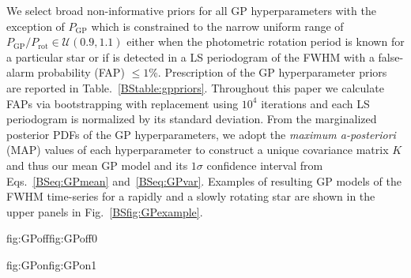 We select broad non-informative priors for all GP hyperparameters with the
exception of $P_{\text{GP}}$ which is constrained to the narrow uniform range of
$P_{\text{GP}}/P_{\text{rot}} \in \mathcal{U}(0.9,1.1)$ either when the photometric rotation period is known for a
particular star or if \prot{} is detected in a LS periodogram
of the FWHM with a false-alarm probability (FAP) $\le 1$\%. Prescription of the GP hyperparameter priors are
reported in Table.~\ref{BStable:gppriors}. Throughout this paper we calculate FAPs via
bootstrapping with replacement using $10^4$ iterations and each LS periodogram is normalized by its standard
deviation. From the marginalized posterior PDFs of the GP hyperparameters, we adopt the \emph{maximum a-posteriori}
(MAP) values of each hyperparameter to construct a unique covariance matrix $K$ and thus our mean GP model
and its $1\sigma$ confidence interval from Eqs.~\ref{BSeq:GPmean} and~\ref{BSeq:GPvar}. Examples of resulting
GP models of the FWHM time-series for a rapidly and a slowly rotating star are shown in the upper panels in
Fig.~\ref{BSfig:GPexample}.





\begin{figure*}
  \centering
  \hspace{-\hsize}%
  \begin{ocg}{fig:GPoff}{fig:GPoff}{0}%
  \end{ocg}%
  \begin{ocg}{fig:GPon}{fig:GPon}{1}%
  \end{ocg}
  \hspace{-\hsize}%
  \caption{Examples of our GP formalism used to mitigate RV activity and detect underlying planetary signals for two
    simulated systems with either a rapidly (\prot{} $=2.8$ days; \emph{left column}) or slowly (\prot{} $=83.1$ days;
    \emph{right column}) rotating host star. \emph{Top panels}: the FWHM time-series used for training along with the
    shown in red. \emph{Middle panels}: the raw
    RV time-series along with the mean GP activity model (in the absence of planets) and its $1\sigma$ confidence interval.
    \emph{Bottom panels}: the RV residuals after removal of the mean GP activity model shown in the middle panels.
    Each system contains 3 planets which contribute to the $O-C$ residuals albeit with semi-amplitudes which are all
    $\lesssim \sigma_{\text{RV}}$. The two upper rows report the MAP values of GP hyperparameters along with their
    $16^{\text{th}}$ and $84^{\text{th}}$ percentiles.}
  \label{BSfig:GPexample}
\end{figure*}

